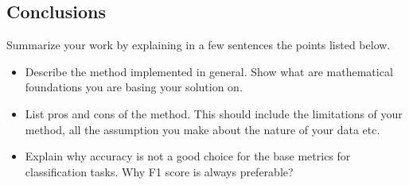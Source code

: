\documentclass[
]{article}
\providecommand{\tightlist}{%
  \setlength{\itemsep}{0pt}\setlength{\parskip}{0pt}}
\begin{document}
\subsection{Conclusions}\label{conclusions}

Summarize your work by explaining in a few sentences the points listed
below.

\begin{itemize}
\tightlist
\item
  Describe the method implemented in general. Show what are mathematical
  foundations you are basing your solution on.
\item
  List pros and cons of the method. This should include the limitations
  of your method, all the assumption you make about the nature of your
  data etc.
\item
  Explain why accuracy is not a good choice for the base metrics for
  classification tasks. Why F1 score is always preferable?
\end{itemize}
\end{document}

